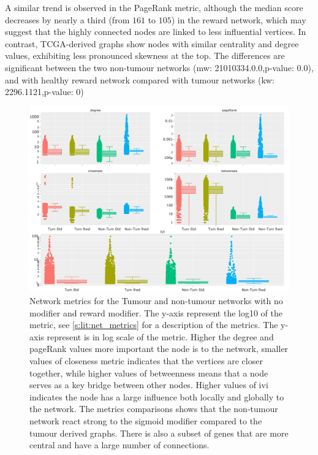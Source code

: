A similar trend is observed in the PageRank metric, although the median score decreases by nearly a third (from $161$ to $105$) in the reward network, which may suggest that the highly connected nodes are linked to less influential vertices. In contrast, TCGA-derived graphs show nodes with similar centrality and degree values, exhibiting less pronounced skewness at the top. The differences are significant between the two non-tumour networks (\acrshort{mw}: 21010334.0.0,p-value: 0.0), and with healthy reward network compared with tumour networks (\acrshort{kw}: 2296.1121,p-value: 0)

\begin{figure}[!htb]    
    \centering
    \includegraphics[width=1.0\textwidth,keepaspectratio]{Sections/Network_II/validation/network_comparison.png}
    \caption[Network metrics for cancerous and healthy graphs]{Network metrics for the Tumour and non-tumour networks with no modifier and reward modifier. The y-axis represent the log10 of the metric, see \cref{s:lit:net_metrics} for a description of the metrics. The y-axis represent is in log scale of the metric. Higher the degree and pageRank values more important the node is to the network, smaller values of closeness metric indicates that the vertices are closer together, while higher values of betweenness means that a node serves as a key bridge between other nodes. Higher values of \acrlong{ivi} indicates the node has a large influence both locally and globally to the network. The metrics comparisons shows that the non-tumour network react strong to the sigmoid modifier compared to the tumour derived graphs. There is also a subset of genes that are more central and have a large number of connections.}
    \label{fig:N_II:net_metrics_comp}
\end{figure}


